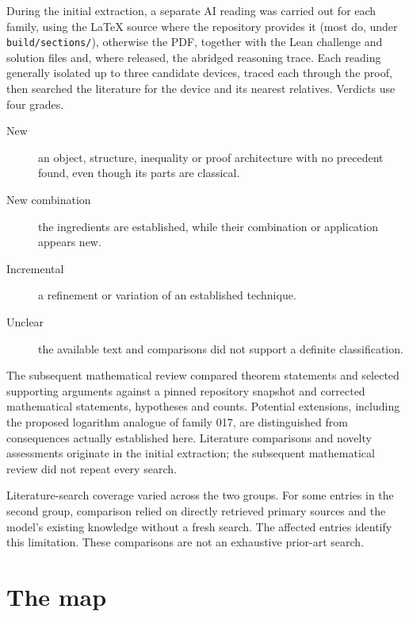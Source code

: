 \documentclass[11pt]{article}
\begin{document}
During the initial extraction, a separate AI reading was carried out for each family, using the LaTeX source where the repository provides it (most do, under \texttt{build/\allowbreak{}sections/\allowbreak{}}), otherwise the PDF, together with the Lean challenge and solution files and, where released, the abridged reasoning trace. Each reading generally isolated up to three candidate devices, traced each through the proof, then searched the literature for the device and its nearest relatives. Verdicts use four grades.

\begin{description}
\item[New] an object, structure, inequality or proof architecture with no precedent found, even though its parts are classical.
\item[New combination] the ingredients are established, while their combination or application appears new.
\item[Incremental] a refinement or variation of an established technique.
\item[Unclear] the available text and comparisons did not support a definite classification.
\end{description}

The subsequent mathematical review compared theorem statements and selected supporting arguments against a pinned repository snapshot and corrected mathematical statements, hypotheses and counts. Potential extensions, including the proposed logarithm analogue of family 017, are distinguished from consequences actually established here. Literature comparisons and novelty assessments originate in the initial extraction; the subsequent mathematical review did not repeat every search.

Literature-search coverage varied across the two groups. For some entries in the second group, comparison relied on directly retrieved primary sources and the model's existing knowledge without a fresh search. The affected entries identify this limitation. These comparisons are not an exhaustive prior-art search.

\section{\texorpdfstring{The map}{The map}}\label{sec:map}
\end{document}
